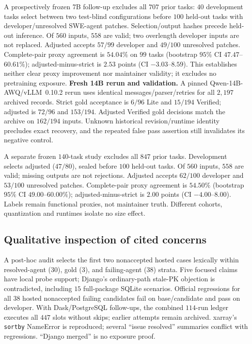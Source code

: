 \documentclass[10pt,conference]{IEEEtran}
\begin{document}
A prospectively frozen 7B follow-up excludes all $707$ prior tasks: $40$ development
tasks select between two test-blind configurations before $100$ held-out tasks with
developer/unresolved SWE-agent patches. Selection/output hashes precede held-out inference.
Of $560$ inputs, $558$ are valid; two overlength developer inputs are not replaced.
Adjusted accepts $57/99$ developer and $49/100$ unresolved patches. Complete-pair proxy
agreement is $54.04\%$ on $99$ tasks (bootstrap $95\%$ CI $47.47$--$60.61\%$);
adjusted-minus-strict is $2.53$ points (CI $-3.03$--$8.59$). This establishes neither
clear proxy improvement nor maintainer validity; it excludes no pretraining exposure.
\textbf{Fresh 14B rerun and validation.} A pinned Qwen-14B-AWQ/vLLM~0.10.2 rerun
uses identical messages/parser/retries for all $2,197$ archived records. Strict gold
acceptance is $6/96$ Lite and $15/194$ Verified; adjusted is $72/96$ and $153/194$.
Adjusted Verified gold decisions match the archive on $162/194$ inputs. Unknown
historical revision/runtime identity precludes exact recovery, and the repeated false
pass assertion still invalidates its negative control.

A separate frozen $140$-task study excludes all $847$ prior tasks. Development
selects adjusted ($47/80$), sealed before $100$ held-out tasks. Of $560$ inputs,
$558$ are valid; missing outputs are not rejections. Adjusted accepts $62/100$
developer and $53/100$ unresolved patches. Complete-pair proxy agreement is
$54.50\%$ (bootstrap $95\%$ CI $49.00$--$60.00\%$); adjusted-minus-strict
is $2.00$ points (CI $-4.00$--$8.00$). Labels remain functional proxies, not
maintainer truth. Different cohorts, quantization and runtimes isolate no size effect.

\subsection{Qualitative inspection of cited concerns}
A post-hoc audit selects the first two nonaccepted hosted cases lexically
within resolved-agent ($30$), gold ($3$), and failing-agent ($38$) strata.
Five focused claims have local probe support; Django's ordinary-path stale-PK objection is
contradicted, including $15$ full-package SQLite scenarios. Official regressions
for all $38$ hosted nonaccepted failing candidates fail on base/candidate and
pass on developer. With Dask/PostgreSQL follow-ups, the combined $114$-run
ledger executes all $447$ slots without skips; earlier attempts remain archived.
xarray's \texttt{sortby} NameError is reproduced; several ``issue resolved''
summaries conflict with regressions. ``Django merged'' is no exposure proof.
\end{document}
